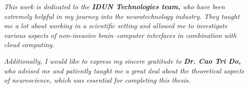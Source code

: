 \begin{dedication}

  \textit{This work is dedicated to the \textbf{IDUN Technologies team,} who have been extremely helpful in my journey into the neurotechnology industry. They taught me a lot about working in a scientific setting and allowed me to investigate various aspects of non-invasive brain–\break computer interfaces in combination with cloud computing.}

  \hfill \break

  \textit{Additionally, I would like to express my sincere gratitude to \textbf{Dr. Cao Tri Do,} who advised me and patiently taught me a great deal about the theoretical aspects of neuroscience, \break which was essential for completing this thesis.}

\end{dedication}

